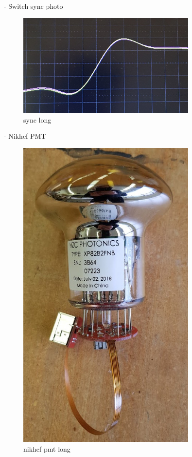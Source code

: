 - Switch sync photo
\begin{figure}
    \includegraphics[width=0.8\textwidth]{diagrams/5-daq/sync.jpg}
    \caption[sync short]{sync long}
    \label{fig:sync}
\end{figure}
- Nikhef PMT
\begin{figure}
    \includegraphics[width=0.8\textwidth]{diagrams/5-daq/nikhef_pmt.jpg}
    \caption[nikhef pmt short]{nikhef pmt long}
    \label{fig:nikhef_pmt}
\end{figure}
